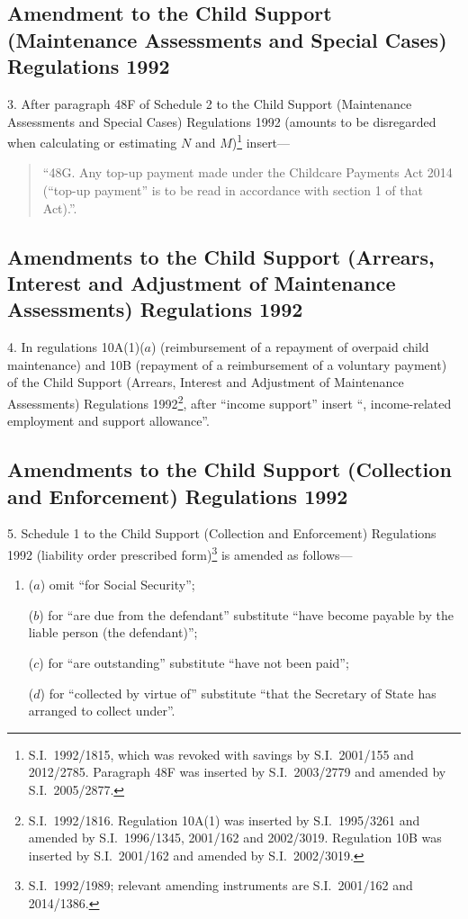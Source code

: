 \documentclass[12pt,a4paper]{article}
\begin{document}
\subsection[3. Amendment to the Child Support (Maintenance Assessments and Special Cases) Regulations 1992]{Amendment to the Child Support (Maintenance Assessments and Special Cases) Regulations 1992}

3.  After paragraph 48F of Schedule 2 to the Child Support (Maintenance Assessments and Special Cases) Regulations 1992 (amounts to be disregarded when calculating or estimating $N$ and $M$)\footnote{S.I.~1992/1815, which was revoked with savings by S.I.~2001/155 and 2012/2785. Paragraph 48F was inserted by S.I.~2003/2779 and amended by S.I.~2005/2877.} insert—
\begin{quotation}
“48G.  Any top-up payment made under the Childcare Payments Act 2014 (“top-up payment” is to be read in accordance with section 1 of that Act).”.
\end{quotation}

\subsection[4. Amendments to the Child Support (Arrears, Interest and Adjustment of Maintenance Assessments) Regulations 1992]{Amendments to the Child Support (Arrears, Interest and Adjustment of Maintenance Assessments) Regulations 1992}

4.  In regulations 10A(1)($a$)  (reimbursement of a repayment of overpaid child maintenance) and 10B (repayment of a reimbursement of a voluntary payment) of the Child Support (Arrears, Interest and Adjustment of Maintenance Assessments) Regulations 1992\footnote{S.I.~1992/1816. Regulation 10A(1) was inserted by S.I.~1995/3261 and amended by S.I.~1996/1345, 2001/162 and 2002/3019. Regulation 10B was inserted by S.I.~2001/162 and amended by S.I.~2002/3019.}, after “income support” insert “, income-related employment and support allowance”.

\subsection[5. Amendments to the Child Support (Collection and Enforcement) Regulations 1992]{Amendments to the Child Support (Collection and Enforcement) Regulations 1992}

5.  Schedule 1 to the Child Support (Collection and Enforcement) Regulations 1992 (liability order prescribed form)\footnote{S.I.~1992/1989; relevant amending instruments are S.I.~2001/162 and 2014/1386.} is amended as follows—
\begin{enumerate}\item[]
($a$) omit “for Social Security”;

($b$) for “are due from the defendant” substitute “have become payable by the liable person (the defendant)”;

($c$) for “are outstanding” substitute “have not been paid”;

($d$) for “collected by virtue of” substitute “that the Secretary of State has arranged to collect under”.
\end{enumerate}
\end{document}
